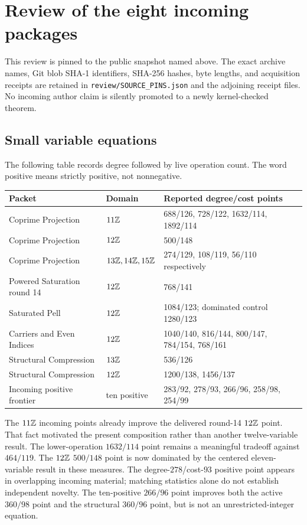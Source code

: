 \section{Review of the eight incoming packages}
This review is pinned to the public snapshot named above. The exact archive names, Git blob SHA-1 identifiers, SHA-256 hashes, byte lengths, and acquisition receipts are retained in \texttt{review/SOURCE\_PINS.json} and the adjoining receipt files. No incoming author claim is silently promoted to a newly kernel-checked theorem.

\subsection{Small variable equations}
The following table records degree followed by live operation count. The word positive means strictly positive, not nonnegative.
\begin{center}\small
\begin{tabular}{@{}llp{82mm}@{}}\toprule
Packet&Domain&Reported degree/cost points\\\midrule
Coprime Projection&$11\mathbb Z$&688/126, 728/122, 1632/114, 1892/114\\
Coprime Projection&$12\mathbb Z$&500/148\\
Coprime Projection&$13\mathbb Z,14\mathbb Z,15\mathbb Z$&274/129, 108/119, 56/110 respectively\\
Powered Saturation round 14&$12\mathbb Z$&768/141\\
Saturated Pell&$12\mathbb Z$&1084/123; dominated control 1280/123\\
Carriers and Even Indices&$12\mathbb Z$&1040/140, 816/144, 800/147, 784/154, 768/161\\
Structural Compression&$13\mathbb Z$&536/126\\
Structural Compression&$12\mathbb Z$&1200/138, 1456/137\\
Incoming positive frontier&ten positive&283/92, 278/93, 266/96, 258/98, 254/99\\\bottomrule
\end{tabular}\end{center}
The $11\mathbb Z$ incoming points already improve the delivered round-14 $12\mathbb Z$ point. That fact motivated the present composition rather than another twelve-variable result. The lower-operation $1632/114$ point remains a meaningful tradeoff against $464/119$. The $12\mathbb Z$ $500/148$ point is now dominated by the centered eleven-variable result in these measures. The degree-$278$/cost-$93$ positive point appears in overlapping incoming material; matching statistics alone do not establish independent novelty. The ten-positive $266/96$ point improves both the active $360/98$ point and the structural $360/96$ point, but is not an unrestricted-integer equation.

